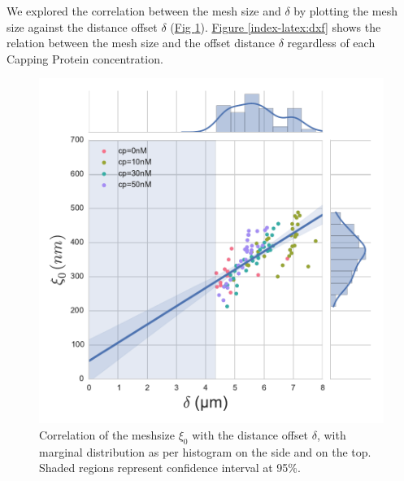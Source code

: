 \documentclass[A4paperpaper,11pt,english]{sphinxmanual}
\begin{document}
We explored the correlation between the mesh size and \(\delta\) by plotting  the mesh size against the distance offset \(\delta\) (\hyperref[index-latex:dxcf]{Fig  \ref*{index-latex:dxcf}}).
\hyperref[index-latex:dxf]{Figure  \ref*{index-latex:dxf}} shows the relation between the mesh size and the offset
distance \(\delta\) regardless of each Capping Protein concentration.
\begin{figure}[htbp]
\centering
\capstart

\includegraphics[width=1.000\linewidth]{delta-xi-corr.pdf}
\caption{Correlation of the meshsize \(\xi_0\) with the distance offset \(\delta\),
with marginal distribution as per histogram on the side and on the top.  Shaded
regions represent confidence interval at 95\%.}\label{index-latex:dxcf}\end{figure}
\end{document}
